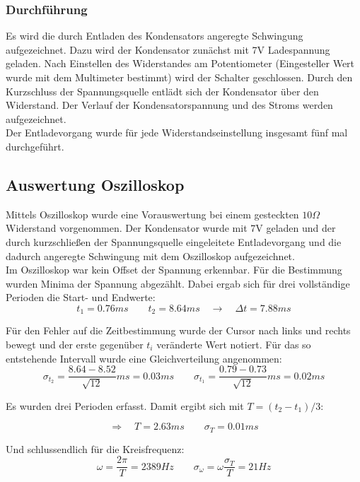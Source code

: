 \documentclass[12pt,a4paper]{article}
\begin{document}
\subsubsection{Durchführung}
Es wird die durch Entladen des Kondensators angeregte Schwingung aufgezeichnet. Dazu wird der Kondensator zunächst mit 7V Ladespannung geladen. Nach Einstellen des Widerstandes am Potentiometer (Eingesteller Wert wurde mit dem Multimeter bestimmt) wird der Schalter geschlossen. Durch den Kurzschluss der Spannungsquelle entlädt sich der Kondensator über den Widerstand. Der Verlauf der Kondensatorspannung und des Stroms werden aufgezeichnet.\\
Der Entladevorgang wurde für jede Widerstandseinstellung insgesamt fünf mal durchgeführt.

\subsection{Auswertung Oszilloskop}
Mittels Oszilloskop wurde eine Vorauswertung bei einem gesteckten $10\Omega$ Widerstand vorgenommen. Der Kondensator wurde mit 7V geladen und der durch kurzschließen der Spannungsquelle eingeleitete Entladevorgang und die dadurch angeregte Schwingung mit dem Oszilloskop aufgezeichnet.\\
Im Oszilloskop war kein Offset der Spannung erkennbar. Für die Bestimmung wurden Minima der Spannung abgezählt. Dabei ergab sich für drei vollständige Perioden die Start- und Endwerte:
\begin{equation}
t_1=0.76ms \quad \quad t_2=8.64ms \quad \rightarrow \quad \Delta t=7.88ms
\end{equation}

Für den Fehler auf die Zeitbestimmung wurde der Cursor nach links und rechts bewegt und der erste gegenüber $t_i$ veränderte Wert notiert. Für das so entstehende Intervall wurde eine Gleichverteilung angenommen:
\begin{equation}
\sigma_{t_2}=\frac{8.64-8.52}{\sqrt{12}}ms=0.03ms \quad \quad 
\sigma_{t_1}=\frac{0.79-0.73}{\sqrt{12}}ms=0.02ms
\end{equation}

Es wurden drei Perioden erfasst. Damit ergibt sich mit $T=(t_2-t_1)/3$:

\begin{equation}
\Rightarrow \quad T=2.63ms \quad \quad \sigma_T=0.01ms
\end{equation}

Und schlussendlich für die Kreisfrequenz:
\begin{equation}
\omega=\frac{2\pi}{T}=2389Hz \quad \quad \sigma_{\omega}=\omega \frac{\sigma_T}{T}=21Hz
\end{equation}
\end{document}
